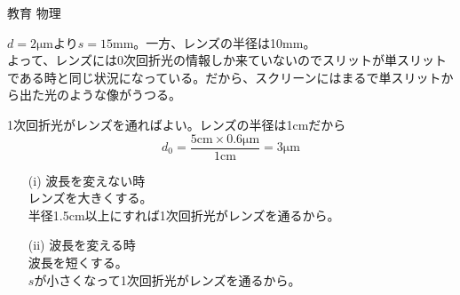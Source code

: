 \documentclass[fleqn]{jbook}
\begin{document}
\begin{answer}{教育 物理}{}
\begin{subanswers}
\begin{subsubanswers}
\SubSubAnswer
$d=2\mathrm{\mu m}$より$s=15\mathrm{mm}$。一方、レンズの半径は10mm。\\
よって、レンズには0次回折光の情報しか来ていないのでスリットが単スリットである時と同じ状況になっている。だから、スクリーンにはまるで単スリットから出た光のような像がうつる。

\SubSubAnswer
1次回折光がレンズを通ればよい。レンズの半径は1cmだから
\[ d_0=\frac{5\mathrm{cm}\times0.6\mathrm{\mu m}}{1\mathrm{cm}}=3\mathrm{\mu m} \]

\SubSubAnswer
\begin{itemize}
\item[(i)]
波長を変えない時 \\
レンズを大きくする。\\
半径1.5cm以上にすれば1次回折光がレンズを通るから。
\item[(ii)]
 波長を変える時 \\
波長を短くする。\\
$s$が小さくなって1次回折光がレンズを通るから。
\end{itemize}
\end{subsubanswers}

\end{subanswers}
\end{answer}
\end{document}
